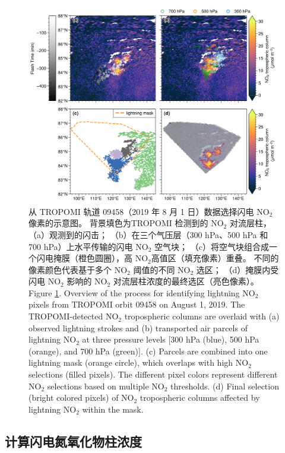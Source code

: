 \begin{figure}[!htbp]
\centering
\includegraphics[width=14cm]{./figures/arctic_workflow.png}
\caption{
从 TROPOMI 轨道 09458（2019 年 8 月 1 日）数据选择闪电 NO$_2$ 像素的示意图。
背景填色为TROPOMI 检测到的 NO$_2$ 对流层柱，
（a）观测到的闪击；
（b）在三个气压层（300 hPa、500 hPa 和 700 hPa）上水平传输的闪电 NO$_2$ 空气块；
（c）将空气块组合成一个闪电掩膜（橙色圆圈），高 NO$_2$高值区（填充像素）重叠。
不同的像素颜色代表基于多个 NO$_2$ 阈值的不同 NO$_2$ 选区；
（d）掩膜内受闪电 NO$_2$ 影响的 NO$_2$ 对流层柱浓度的最终选区（亮色像素）。\\
Figure \ref{fig:workflow}. Overview of the process for identifying lightning NO$_2$ pixels from TROPOMI orbit 09458 on August 1, 2019.
The TROPOMI-detected NO$_2$ tropospheric columns are overlaid with (a) observed lightning strokes and
(b) transported air parcels of lightning NO$_2$ at three pressure levels [300 hPa (blue), 500 hPa (orange), and 700 hPa (green)].
(c) Parcels are combined into one lightning mask (orange circle), which overlaps with high NO$_2$ selections (filled pixels). The different pixel colors represent different NO$_2$ selections based on multiple NO$_2$ thresholds.
(d) Final selection (bright colored pixels) of NO$_2$ tropospheric columns affected by lightning NO$_2$ within the mask.
}
\label{fig:workflow}
\end{figure}

\subsection*{计算闪电氮氧化物柱浓度}

